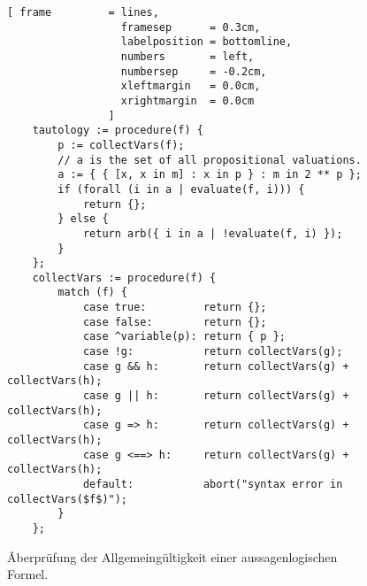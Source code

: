 \begin{figure}[!ht]
  \centering
\begin{Verbatim}[ frame         = lines, 
                  framesep      = 0.3cm, 
                  labelposition = bottomline,
                  numbers       = left,
                  numbersep     = -0.2cm,
                  xleftmargin   = 0.0cm,
                  xrightmargin  = 0.0cm
                ]
    tautology := procedure(f) {
        p := collectVars(f);
        // a is the set of all propositional valuations.
        a := { { [x, x in m] : x in p } : m in 2 ** p };
        if (forall (i in a | evaluate(f, i))) {
            return {};
        } else {
            return arb({ i in a | !evaluate(f, i) });
        }
    };
    collectVars := procedure(f) {
        match (f) {
            case true:         return {};
            case false:        return {};
            case ^variable(p): return { p };
            case !g:           return collectVars(g);
            case g && h:       return collectVars(g) + collectVars(h);
            case g || h:       return collectVars(g) + collectVars(h);
            case g => h:       return collectVars(g) + collectVars(h);
            case g <==> h:     return collectVars(g) + collectVars(h);
            default:           abort("syntax error in collectVars($f$)");
        }
    };    
\end{Verbatim}
\vspace*{-0.3cm}
  \caption{Ãberpr\"{u}fung der Allgemeing\"{u}ltigkeit einer aussagenlogischen Formel.}
  \label{fig:tautology.stlx}
\end{figure} 

